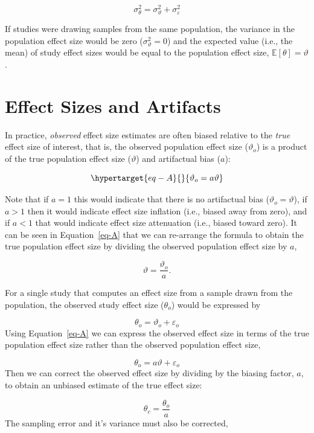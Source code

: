 \documentclass[
  letterpaper,
  DIV=11,
  numbers=noendperiod]{scrreprt}
\begin{document}
\[
\sigma^2_\theta = \sigma^2_\vartheta + \sigma^2_\varepsilon
\]

If studies were drawing samples from the same population, the variance
in the population effect size would be zero (\(\sigma^2_\vartheta = 0\))
and the expected value (i.e., the mean) of study effect sizes would be
equal to the population effect size, \(\mathbb{E}[\theta]=\vartheta\).

\hypertarget{effect-sizes-and-artifacts}{%
\section{Effect Sizes and Artifacts}\label{effect-sizes-and-artifacts}}

In practice, \emph{observed} effect size estimates are often biased
relative to the \emph{true} effect size of interest, that is, the
observed population effect size (\(\vartheta_o\)) is a product of the
true population effect size (\(\vartheta\)) and artifactual bias
(\(a\)):

\begin{equation}\protect\hypertarget{eq-A}{}{
\vartheta_o = a\vartheta
}\label{eq-A}\end{equation}

Note that if \(a=1\) this would indicate that there is no artifactual
bias (\(\vartheta_o=\vartheta\)), if \(a>1\) then it would indicate
effect size inflation (i.e., biased away from zero), and if \(a<1\) that
would indicate effect size attenuation (i.e., biased toward zero). It
can be seen in Equation~\ref{eq-A} that we can re-arrange the formula to
obtain the true population effect size by dividing the observed
population effect size by \(a\),

\[
\vartheta = \frac{\vartheta_o}{a}.
\]

For a single study that computes an effect size from a sample drawn from
the population, the observed study effect size (\(\theta_o\)) would be
expressed by

\[
\theta_o = \vartheta_o + \varepsilon_o
\] Using Equation~\ref{eq-A} we can express the observed effect size in
terms of the true population effect size rather than the observed
population effect size,

\[
\theta_o = a\vartheta + \varepsilon_o
\] Then we can correct the observed effect size by dividing by the
biasing factor, \(a\), to obtain an unbiased estimate of the true effect
size:

\[
\theta_c = \frac{\theta_o}{a}
\] The sampling error and it's variance must also be corrected,
\end{document}
